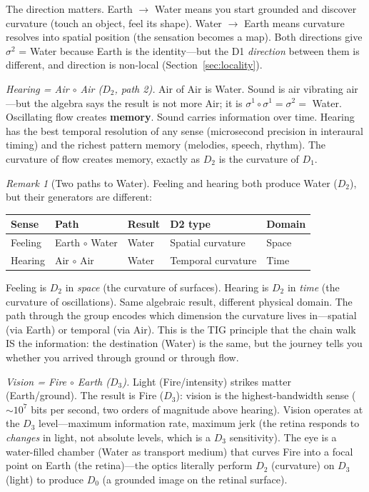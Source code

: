 \documentclass[11pt]{article}
\theoremstyle{definition}
\theoremstyle{remark}
\newtheorem{remark}[theorem]{Remark}
\begin{document}
The direction matters.  Earth $\to$ Water means you start grounded and
discover curvature (touch an object, feel its shape).  Water $\to$ Earth
means curvature resolves into spatial position (the sensation becomes a
map).  Both directions give $\sigma^2$ = Water because Earth is the
identity---but the D1 \emph{direction} between them is different, and
direction is non-local (Section~\ref{sec:locality}).

\emph{Hearing = Air $\circ$ Air ($D_2$, path 2).}
Air of Air is Water.  Sound is air vibrating air---but the algebra says
the result is not more Air; it is $\sigma^1 \circ \sigma^1 = \sigma^2 = $
Water.  Oscillating flow creates \textbf{memory}.  Sound carries
information over time.  Hearing has the best temporal resolution of any
sense (microsecond precision in interaural timing) and the richest pattern
memory (melodies, speech, rhythm).  The curvature of flow creates memory,
exactly as $D_2$ is the curvature of $D_1$.

\begin{remark}[Two paths to Water]
Feeling and hearing both produce Water ($D_2$), but their generators are
different:
\begin{center}
\begin{tabular}{lllll}
\toprule
\textbf{Sense} & \textbf{Path} & \textbf{Result} & \textbf{D2 type} & \textbf{Domain} \\
\midrule
Feeling & Earth $\circ$ Water & Water & Spatial curvature & Space \\
Hearing & Air $\circ$ Air & Water & Temporal curvature & Time \\
\bottomrule
\end{tabular}
\end{center}
Feeling is $D_2$ in \emph{space} (the curvature of surfaces).  Hearing
is $D_2$ in \emph{time} (the curvature of oscillations).  Same algebraic
result, different physical domain.  The path through the group encodes
which dimension the curvature lives in---spatial (via Earth) or temporal
(via Air).  This is the TIG principle that the chain walk IS the
information: the destination (Water) is the same, but the journey tells you
whether you arrived through ground or through flow.
\end{remark}

\emph{Vision = Fire $\circ$ Earth ($D_3$).}
Light (Fire/intensity) strikes matter (Earth/ground).  The result is
Fire ($D_3$): vision is the highest-bandwidth sense ($\sim 10^7$ bits per
second, two orders of magnitude above hearing).  Vision operates at the
$D_3$ level---maximum information rate, maximum jerk (the retina responds
to \emph{changes} in light, not absolute levels, which is a $D_3$
sensitivity).  The eye is a water-filled chamber (Water as transport
medium) that curves Fire into a focal point on Earth (the retina)---the
optics literally perform $D_2$ (curvature) on $D_3$ (light) to produce
$D_0$ (a grounded image on the retinal surface).
\end{document}
